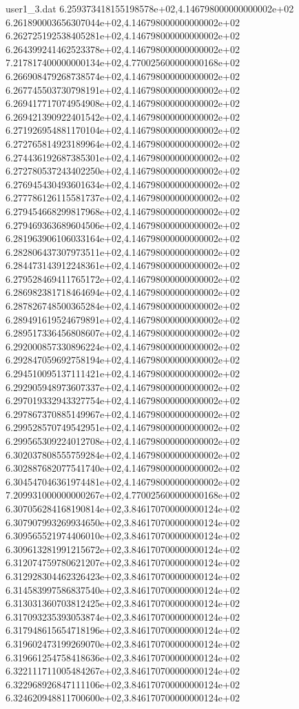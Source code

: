 \begin{filecontents}{user1_3.dat}
6.259373418155198578e+02,4.146798000000000002e+02
6.261890003656307044e+02,4.146798000000000002e+02
6.262725192538405281e+02,4.146798000000000002e+02
6.264399241462523378e+02,4.146798000000000002e+02
7.217817400000000134e+02,4.770025600000000168e+02
6.266908479268738574e+02,4.146798000000000002e+02
6.267745503730798191e+02,4.146798000000000002e+02
6.269417717074954908e+02,4.146798000000000002e+02
6.269421390922401542e+02,4.146798000000000002e+02
6.271926954881170104e+02,4.146798000000000002e+02
6.272765814923189964e+02,4.146798000000000002e+02
6.274436192687385301e+02,4.146798000000000002e+02
6.272780537243402250e+02,4.146798000000000002e+02
6.276945430493601634e+02,4.146798000000000002e+02
6.277786126115581737e+02,4.146798000000000002e+02
6.279454668299817968e+02,4.146798000000000002e+02
6.279469363689604506e+02,4.146798000000000002e+02
6.281963906106033164e+02,4.146798000000000002e+02
6.282806437307973511e+02,4.146798000000000002e+02
6.284473143912248361e+02,4.146798000000000002e+02
6.279528469411765172e+02,4.146798000000000002e+02
6.286982381718464694e+02,4.146798000000000002e+02
6.287826748500365284e+02,4.146798000000000002e+02
6.289491619524679891e+02,4.146798000000000002e+02
6.289517336456808607e+02,4.146798000000000002e+02
6.292000857330896224e+02,4.146798000000000002e+02
6.292847059692758194e+02,4.146798000000000002e+02
6.294510095137111421e+02,4.146798000000000002e+02
6.292905948973607337e+02,4.146798000000000002e+02
6.297019332943327754e+02,4.146798000000000002e+02
6.297867370885149967e+02,4.146798000000000002e+02
6.299528570749542951e+02,4.146798000000000002e+02
6.299565309224012708e+02,4.146798000000000002e+02
6.302037808555759284e+02,4.146798000000000002e+02
6.302887682077541740e+02,4.146798000000000002e+02
6.304547046361974481e+02,4.146798000000000002e+02
7.209931000000000267e+02,4.770025600000000168e+02
6.307056284168190814e+02,3.846170700000000124e+02
6.307907993269934650e+02,3.846170700000000124e+02
6.309565521974406010e+02,3.846170700000000124e+02
6.309613281991215672e+02,3.846170700000000124e+02
6.312074759780621207e+02,3.846170700000000124e+02
6.312928304462326423e+02,3.846170700000000124e+02
6.314583997586837540e+02,3.846170700000000124e+02
6.313031360703812425e+02,3.846170700000000124e+02
6.317093235393053874e+02,3.846170700000000124e+02
6.317948615654718196e+02,3.846170700000000124e+02
6.319602473199269070e+02,3.846170700000000124e+02
6.319661254758418636e+02,3.846170700000000124e+02
6.322111711005484267e+02,3.846170700000000124e+02
6.322968926847111106e+02,3.846170700000000124e+02
6.324620948811700600e+02,3.846170700000000124e+02

\end{filecontents}

